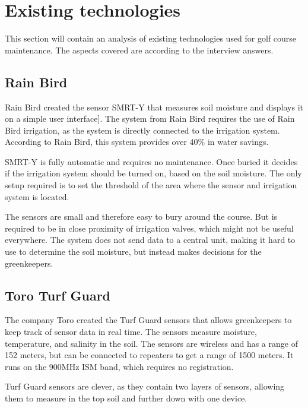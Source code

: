 \section{Existing technologies}
This section will contain an analysis of existing technologies used for golf course maintenance. The aspects covered are according to the interview answers.

\subsection{Rain Bird}
Rain Bird created the sensor SMRT-Y that measures soil moisture and displays it on a simple user interface\cite{smrty}].
The system from Rain Bird requires the use of Rain Bird irrigation, as the system is directly connected to the irrigation system. 
According to Rain Bird, this system provides over 40\% in water savings\cite{smrty2}.

SMRT-Y is fully automatic and requires no maintenance. Once buried it decides if the irrigation system should be turned on, based on the soil moisture. 
The only setup required is to set the threshold of the area where the sensor and irrigation system is located\cite{smrty2}.

The sensors are small and therefore easy to bury around the course. But is required to be in close proximity of irrigation valves, which might not be useful everywhere.
The system does not send data to a central unit, making it hard to use to determine the soil moisture, but instead makes decisions for the greenkeepers. 

\subsection{Toro Turf Guard\texttrademark{}}
The company Toro created the Turf Guard\texttrademark{} sensors that allows greenkeepers to keep track of sensor data in real time. The sensors measure moisture, temperature, and salinity in the soil\cite{turfGuard}.
The sensors are wireless and has a range of 152 meters, but can be connected to repeaters to get a range of 1500 meters\cite{turfGuard}. It runs on the 900MHz ISM band, which requires no registration.

Turf Guard\texttrademark{} sensors are clever, as they contain two layers of sensors, allowing them to measure in the top soil and further down with one device.

